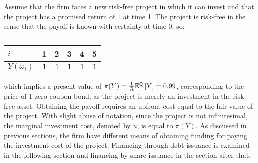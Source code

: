 \documentclass[main.tex]{subfiles}
\begin{document}
    Assume that the firm faces a new risk-free project in which it can invest
    and that the project has a promised return of $\num{1}$ at time 1.
    The project is risk-free in the sense that the payoff is known with certainty at time 0, so:
        \begin{table}[H]
            \centering
            \begin{tabular}{l|rrrrr}
                $i$ & 1 & 2 & 3 & 4 & 5 \\
                \hline
                $Y(\omega_{i})$ & $\num{1}$ & $\num{1}$ & $\num{1}$ & $\num{1}$ & $\num{1}$
            \end{tabular}
            \caption{}
        \end{table}
    which implies a present value of $\pi(Y) = \frac{1}{R} \mathbb{E}^{\mathbb{Q}}\left[Y\right] = \num{0.99}$, 
    corresponding to the price of 1 zero coupon bond, as the project is merely an investment in the risk-free asset.
    Obtaining the payoff requires an upfront cost equal to the fair value of the project.
    With slight abuse of notation, since the project is not infinitesimal, 
    the marginal investment cost, denoted by $u$, is equal to $\pi(Y)$.
    As discussed in previous sections, the firm have different means of obtaining funding
    for paying the investment cost of the project.
    Financing through debt issuance is examined in the following section 
    and financing by share issuance in the section after that.
\end{document}
